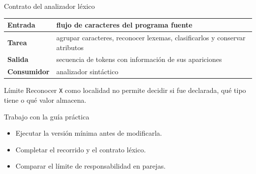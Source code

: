 \documentclass[11pt,spanish]{beamer}
\newcommand{\actividad}[1]{\textbf{\textcolor{Rojo}{#1}}}
\begin{document}
\begin{frame}{Contrato del analizador léxico}
\vfill

\begin{center}
\small
\renewcommand{\arraystretch}{1.35}
\begin{tabular}{|L{.18\textwidth}|L{.66\textwidth}|}
\hline
\textbf{Entrada} & flujo de caracteres del programa fuente \\
\hline
\textbf{Tarea} & agrupar caracteres, reconocer lexemas, clasificarlos y conservar atributos \\
\hline
\textbf{Salida} & secuencia de tokens con información de sus apariciones \\
\hline
\textbf{Consumidor} & analizador sintáctico \\
\hline
\end{tabular}
\end{center}

\bigskip

\begin{alertblock}{Límite}
Reconocer \texttt{X} como localidad no permite decidir si fue declarada, qué tipo tiene o qué valor almacena.
\end{alertblock}

\vfill
\end{frame}

\begin{frame}{Trabajo con la guía práctica}
\vfill
\begin{center}
\end{center}
\bigskip
\begin{itemize}
  \item Ejecutar la versión mínima antes de modificarla.
  \item Completar el recorrido y el contrato léxico.
  \item Comparar el límite de responsabilidad en parejas.
\end{itemize}
\vfill
\end{frame}
\end{document}
